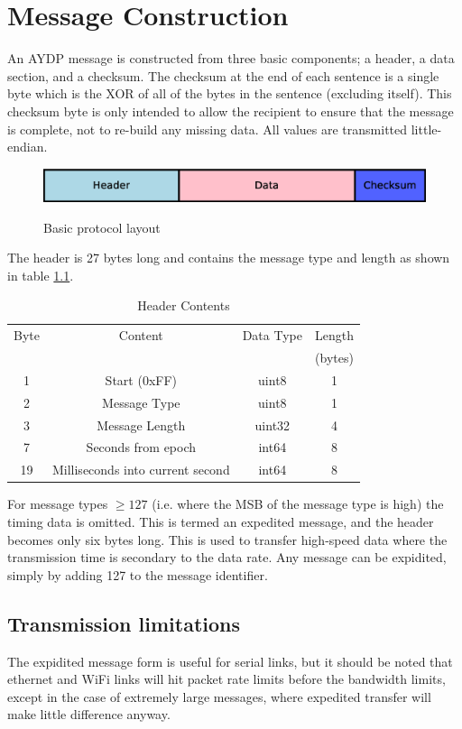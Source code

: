 \chapter{Message Construction}
An AYDP message is constructed from three basic components; a header, a data section, and a checksum. The checksum at the end of each sentence is a single byte which is the XOR of all of the bytes in the sentence (excluding itself). This checksum byte is only intended to allow the recipient to ensure that the message is complete, not to re-build any missing data. All values are transmitted little-endian.

\begin{figure}[H]
  \centering
  \includegraphics[width=1.0\textwidth]{Figures/protocolBasicLayout.eps}
  \label{figure:msg:basicProto}
  \caption{Basic protocol layout}
\end{figure}

The header is 27 bytes long and contains the message type and length as shown in table \ref{table:msg:header}.

\begin{table}[H]
  \centering
  \begin{tabular}{ c c c c }
  Byte &          Content    & Data Type & Length  \\
       &                     &           & (bytes) \\
\hline
   1   &  Start (0xFF)       &   uint8   &    1    \\
   2   &  Message Type       &   uint8   &    1    \\
   3   &  Message Length     &   uint32  &    4    \\
   7   &  Seconds from epoch &   int64   &    8    \\
   19  &  Milliseconds into current second & int64 & 8 \\
  \end{tabular}
  \caption{Header Contents}
  \label{table:msg:header}
\end{table}

For message types $\geq 127$ (i.e. where the MSB of the message type is high) the timing data is omitted. This is termed an expedited message, and the header becomes only six bytes long. This is used to transfer high-speed data where the transmission time is secondary to the data rate. Any message can be expidited, simply by adding 127 to the message identifier.

\section{Transmission limitations}

The expidited message form is useful for serial links, but it should be noted that ethernet and WiFi links will hit packet rate limits before the bandwidth limits, except in the case of extremely large messages, where expedited transfer will make little difference anyway.
